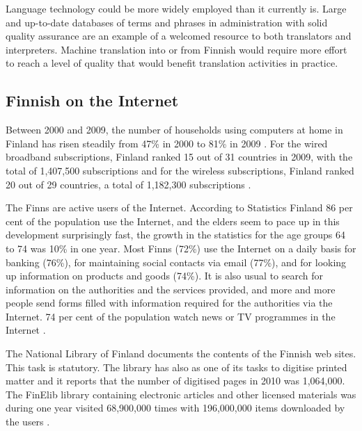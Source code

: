 \begin{multicols}{2}
Language technology could be more widely employed than it currently is. Large and up-to-date databases of terms and phrases in administration with solid quality assurance are an example of a welcomed resource to both translators and interpreters. Machine translation into or from Finnish would require more effort to reach a level of quality that would benefit translation activities in practice.

\subsection{Finnish on the Internet}

Between 2000 and 2009, the number of households using computers at home in Finland has risen steadily from 47\% in 2000 to 81\% in 2009 \cite{OECD-ICT}. For the wired broadband subscriptions, Finland ranked 15 out of 31 countries in 2009, with the total of 1,407,500 subscriptions \cite{OECD-wired} and for the wireless subscriptions, Finland ranked 20 out of 29 countries, a total of 1,182,300 subscriptions \cite{OECD-mobile}.  


The Finns are active users of the Internet. According to Statistics Finland 86 per cent of the population use the Internet, and the elders seem to pace up in this development surprisingly fast, the growth in the statistics for the age groups 64 to 74 was 10\% in one year. Most Finns (72\%) use the Internet on a daily basis for banking (76\%), for maintaining social contacts via email (77\%), and for looking up information on products and goods (74\%). It is also usual to search for information on the authorities and the services provided, and more and more people send forms filled with information required for the authorities via the Internet. 74 per cent of the population watch news or TV programmes in the Internet \cite{SVT}.

The National Library of Finland documents the contents of the Finnish web sites. This task is statutory. The library has also as one of its tasks to digitise printed matter and it reports that the number of digitised pages in 2010 was 1,064,000. The FinElib library containing electronic articles and other licensed materials was during one year visited 68,900,000 times with 196,000,000 items downloaded by the users \cite{natlibstat}.


\end{multicols}
